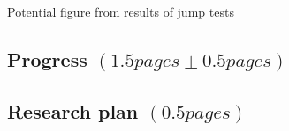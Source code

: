 \documentclass[rmp,nofootinbib,superscriptaddress,12pt,tightenlines,notitlepage]{revtex4-1}
\begin{document}
Potential figure from results of jump tests



\subsection{Progress $\left(1.5 pages \pm 0.5 pages\right)$}

\subsection{Research plan $\left(0.5 pages\right)$}



\end{document}
